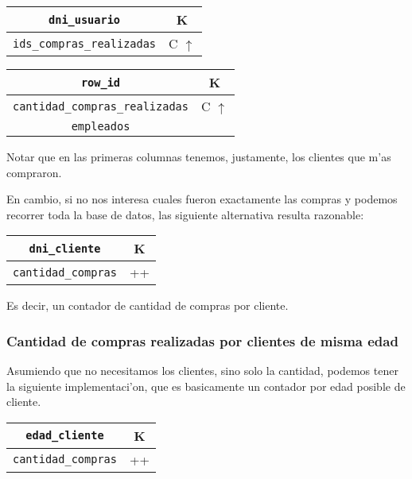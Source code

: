 \begin{center}
\begin{tabular}{|c|c|}
\hline
\texttt{dni\_usuario} & K\\
\hline
\texttt{ids\_compras\_realizadas} & C $\uparrow$\\
\hline
\end{tabular}
\end{center}

\begin{center}
\begin{tabular}{|c|c|}
\hline
\texttt{row\_id} & K\\
\hline
\texttt{cantidad\_compras\_realizadas} & C $\uparrow$\\
\hline
\texttt{empleados} & \\
\hline
\end{tabular}
\end{center}

Notar que en las primeras columnas tenemos, justamente, los clientes que m'as compraron.

En cambio, si no nos interesa cuales fueron exactamente las compras y podemos recorrer toda la base de datos, las siguiente alternativa resulta razonable:

\begin{center}
\begin{tabular}{|c|c|}
\hline
\texttt{dni\_cliente} & K\\
\hline
\texttt{cantidad\_compras} & ++\\
\hline
\end{tabular}
\end{center}

Es decir, un contador de cantidad de compras por cliente.

\subsubsection{Cantidad de compras realizadas por clientes de misma edad}

Asumiendo que no necesitamos los clientes, sino solo la cantidad, podemos tener la siguiente implementaci'on, que es basicamente un contador por edad posible de cliente.

\begin{center}
\begin{tabular}{|c|c|}
\hline
\texttt{edad\_cliente} & K\\
\hline
\texttt{cantidad\_compras} & ++\\
\hline
\end{tabular}
\end{center}

